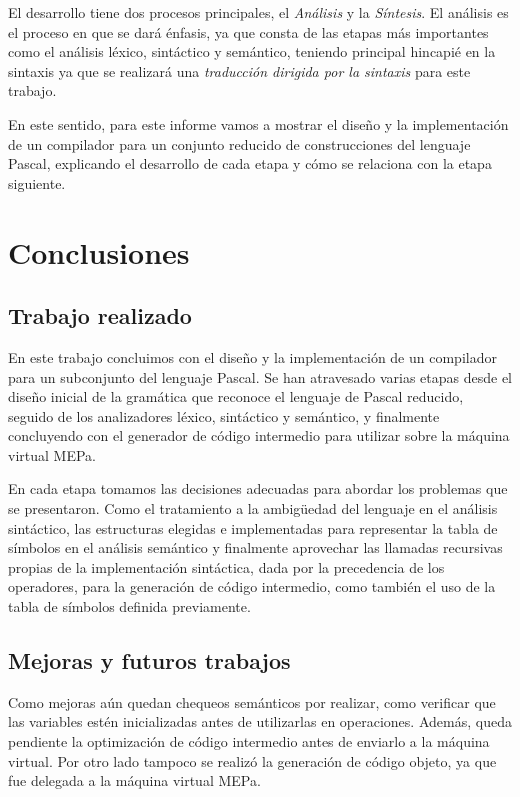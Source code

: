 \documentclass[a4paper]{report}
\begin{document}
El desarrollo tiene dos procesos principales, el \emph{Análisis} y la \emph{Síntesis}. El análisis es el proceso en que se dará énfasis, ya que consta de las etapas más importantes como el análisis léxico, sintáctico y semántico, teniendo principal hincapié en la sintaxis ya que se realizará una \emph{traducción dirigida por la sintaxis} para este trabajo.

En este sentido, para este informe vamos a mostrar el diseño y la implementación de un compilador para un conjunto reducido de construcciones del lenguaje Pascal, explicando el desarrollo de cada etapa y cómo se relaciona con la etapa siguiente.

\setcounter{page}{1}











\chapter{Conclusiones}

\section{Trabajo realizado}
En este trabajo concluimos con el diseño y la implementación de un compilador para un subconjunto del lenguaje Pascal. Se han atravesado varias etapas desde el diseño inicial de la gramática que reconoce el lenguaje de Pascal reducido, seguido de los analizadores léxico, sintáctico y semántico, y finalmente concluyendo con el generador de código intermedio para utilizar sobre la máquina virtual MEPa.

En cada etapa tomamos las decisiones adecuadas para abordar los problemas que se presentaron. Como el tratamiento a la ambigüedad del lenguaje en el análisis sintáctico, las estructuras elegidas e implementadas para representar la tabla de símbolos en el análisis semántico y finalmente aprovechar las llamadas recursivas propias de la implementación sintáctica, dada por la precedencia de los operadores, para la generación de código intermedio, como también el uso de la tabla de símbolos definida previamente.

\section{Mejoras y futuros trabajos}
Como mejoras aún quedan chequeos semánticos por realizar, como verificar que las variables estén inicializadas antes de utilizarlas en operaciones. Además, queda pendiente la optimización de código intermedio antes de enviarlo a la máquina virtual. Por otro lado tampoco se realizó la generación de código objeto, ya que fue delegada a la máquina virtual MEPa.


\end{document}
